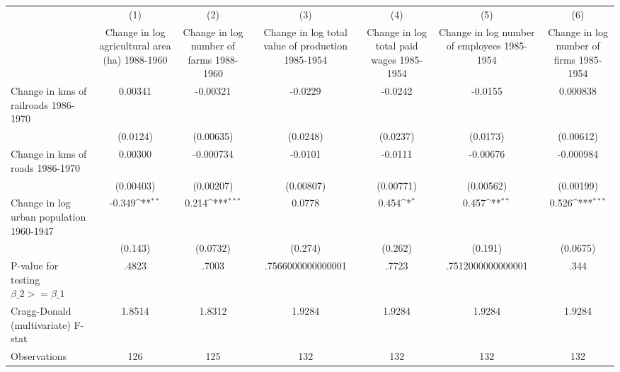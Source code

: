 {
\def\sym#1{\ifmmode^{#1}\else\(^{#1}\)\fi}
\begin{tabular}{l*{6}{c}}
\hline\hline
                &\multicolumn{1}{c}{(1)}&\multicolumn{1}{c}{(2)}&\multicolumn{1}{c}{(3)}&\multicolumn{1}{c}{(4)}&\multicolumn{1}{c}{(5)}&\multicolumn{1}{c}{(6)}\\
                &\multicolumn{1}{c}{Change in log agricultural area (ha) 1988-1960}&\multicolumn{1}{c}{Change in log number of farms 1988-1960}&\multicolumn{1}{c}{Change in log total value of production 1985-1954}&\multicolumn{1}{c}{Change in log total paid wages 1985-1954}&\multicolumn{1}{c}{Change in log number of employees 1985-1954}&\multicolumn{1}{c}{Change in log number of firms 1985-1954}\\
\hline
Change in kms of railroads 1986-1970&  0.00341         & -0.00321         &  -0.0229         &  -0.0242         &  -0.0155         & 0.000838         \\
                & (0.0124)         &(0.00635)         & (0.0248)         & (0.0237)         & (0.0173)         &(0.00612)         \\
[1em]
Change in kms of roads 1986-1970&  0.00300         &-0.000734         &  -0.0101         &  -0.0111         & -0.00676         &-0.000984         \\
                &(0.00403)         &(0.00207)         &(0.00807)         &(0.00771)         &(0.00562)         &(0.00199)         \\
[1em]
Change in log urban population 1960-1947&   -0.349\sym{**} &    0.214\sym{***}&   0.0778         &    0.454\sym{*}  &    0.457\sym{**} &    0.526\sym{***}\\
                &  (0.143)         & (0.0732)         &  (0.274)         &  (0.262)         &  (0.191)         & (0.0675)         \\
\hline
P-value for testing $\beta\_{2} >= \beta\_{1}$&    .4823         &    .7003         &.7566000000000001         &    .7723         &.7512000000000001         &     .344         \\
Cragg-Donald (multivariate) F-stat&   1.8514         &   1.8312         &   1.9284         &   1.9284         &   1.9284         &   1.9284         \\
Observations    &      126         &      125         &      132         &      132         &      132         &      132         \\
\hline\hline
\end{tabular}
}
